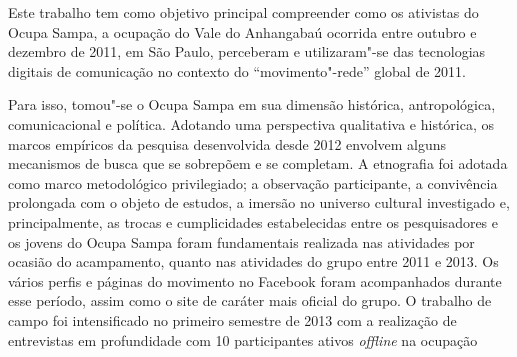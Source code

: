 Este trabalho tem como objetivo principal compreender como os
ativistas do Ocupa Sampa, a ocupação do Vale do Anhangabaú ocorrida
entre outubro e dezembro de 2011, em São Paulo, perceberam e
utilizaram"-se das tecnologias digitais de comunicação no contexto do
``movimento"-rede'' global de 2011.

Para isso, tomou"-se o Ocupa Sampa em sua dimensão histórica,
antropológica, comunicacional e política. Adotando uma perspectiva
qualitativa e histórica, os marcos empíricos da pesquisa desenvolvida
desde 2012 envolvem alguns mecanismos de busca que se sobrepõem e se
completam. A etnografia foi adotada como marco metodológico
privilegiado; a observação participante, a convivência prolongada com o
objeto de estudos, a imersão no universo cultural investigado e,
principalmente, as trocas e cumplicidades estabelecidas entre os
pesquisadores e os jovens do Ocupa Sampa foram fundamentais realizada
nas atividades por ocasião do acampamento, quanto nas atividades do
grupo entre 2011 e 2013. Os vários perfis e páginas do movimento no
Facebook foram acompanhados durante esse período, assim como o site de
caráter mais oficial do grupo. O trabalho de campo foi intensificado no
primeiro semestre de 2013 com a realização de entrevistas em
profundidade com 10 participantes ativos \emph{\emph{offline}} na ocupação
